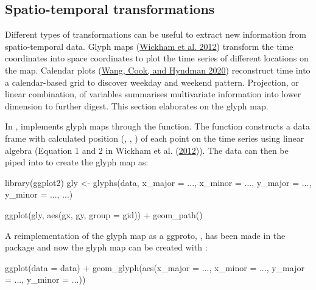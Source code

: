 \documentclass{article}
\newenvironment{Shaded}{\begin{snugshade}}{\end{snugshade}}
\newcommand{\AttributeTok}[1]{\textcolor[rgb]{0.77,0.63,0.00}{#1}}
\newcommand{\FunctionTok}[1]{\textcolor[rgb]{0.00,0.00,0.00}{#1}}
\newcommand{\NormalTok}[1]{#1}
\newcommand{\OtherTok}[1]{\textcolor[rgb]{0.56,0.35,0.01}{#1}}
\newcommand{\SpecialCharTok}[1]{\textcolor[rgb]{0.00,0.00,0.00}{#1}}
\begin{document}
\hypertarget{st_transformation}{%
\subsection{Spatio-temporal transformations}\label{st_transformation}}

Different types of transformations can be useful to extract new information from spatio-temporal data. Glyph maps (\protect\hyperlink{ref-Wickham2012-yr}{Wickham et al. 2012}) transform the time coordinates into space coordinates to plot the time series of different locations on the map. Calendar plots (\protect\hyperlink{ref-wang2020calendar}{Wang, Cook, and Hyndman 2020}) reconstruct time into a calendar-based grid to discover weekday and weekend pattern. Projection, or linear combination, of variables summarises multivariate information into lower dimension to further digest. This section elaborates on the glyph map.

In ,  implements glyph maps through the  function. The function constructs a data frame with calculated position (, , ) of each point on the time series using linear algebra (Equation 1 and 2 in Wickham et al. (\protect\hyperlink{ref-Wickham2012-yr}{2012})). The data can then be piped into  to create the glyph map as:

\begin{Shaded}
\begin{Highlighting}[]
\FunctionTok{library}\NormalTok{(ggplot2)}
\NormalTok{gly }\OtherTok{\textless{}{-}} \FunctionTok{glyphs}\NormalTok{(data,}
              \AttributeTok{x\_major =}\NormalTok{ ..., }\AttributeTok{x\_minor =}\NormalTok{ ...,}
              \AttributeTok{y\_major =}\NormalTok{ ..., }\AttributeTok{y\_minor =}\NormalTok{ ..., ...)}

\FunctionTok{ggplot}\NormalTok{(gly, }\FunctionTok{aes}\NormalTok{(gx, gy, }\AttributeTok{group =}\NormalTok{ gid)) }\SpecialCharTok{+}
  \FunctionTok{geom\_path}\NormalTok{()}
\end{Highlighting}
\end{Shaded}

A reimplementation of the glyph map as a ggproto, , has been made in the  package and now the glyph map can be created with :

\begin{Shaded}
\begin{Highlighting}[]
\FunctionTok{ggplot}\NormalTok{(}\AttributeTok{data =}\NormalTok{ data) }\SpecialCharTok{+}
  \FunctionTok{geom\_glyph}\NormalTok{(}\FunctionTok{aes}\NormalTok{(}\AttributeTok{x\_major =}\NormalTok{ ..., }\AttributeTok{x\_minor =}\NormalTok{ ...,}
                 \AttributeTok{y\_major =}\NormalTok{ ..., }\AttributeTok{y\_minor =}\NormalTok{ ...))}
\end{Highlighting}
\end{Shaded}
\end{document}
